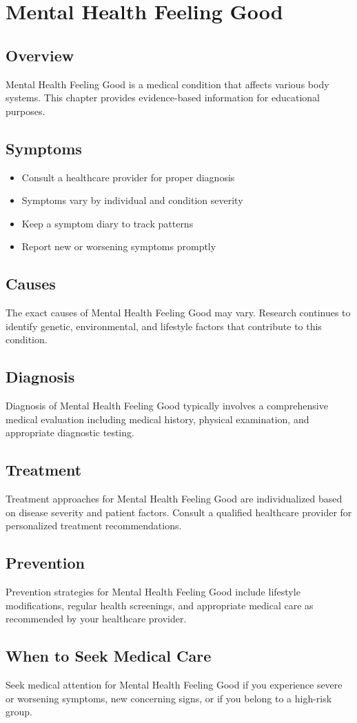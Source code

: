 \chapter{Mental Health Feeling Good}

\section*{Overview}
Mental Health Feeling Good is a medical condition that affects various body systems. This chapter provides evidence-based information for educational purposes.

\section*{Symptoms}
\begin{itemize}
  \item Consult a healthcare provider for proper diagnosis
  \item Symptoms vary by individual and condition severity
  \item Keep a symptom diary to track patterns
  \item Report new or worsening symptoms promptly
\end{itemize}

\section*{Causes}
The exact causes of Mental Health Feeling Good may vary. Research continues to identify genetic, environmental, and lifestyle factors that contribute to this condition.

\section*{Diagnosis}
Diagnosis of Mental Health Feeling Good typically involves a comprehensive medical evaluation including medical history, physical examination, and appropriate diagnostic testing.

\section*{Treatment}
Treatment approaches for Mental Health Feeling Good are individualized based on disease severity and patient factors. Consult a qualified healthcare provider for personalized treatment recommendations.

\section*{Prevention}
Prevention strategies for Mental Health Feeling Good include lifestyle modifications, regular health screenings, and appropriate medical care as recommended by your healthcare provider.

\section*{When to Seek Medical Care}
Seek medical attention for Mental Health Feeling Good if you experience severe or worsening symptoms, new concerning signs, or if you belong to a high-risk group.
\clearpage
